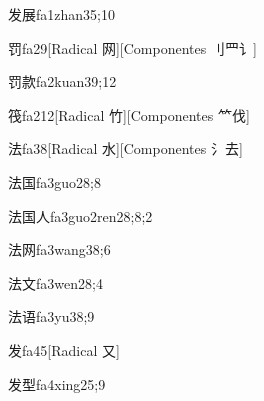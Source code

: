 \begin{verbete}{发展}{fa1zhan3}{5;10}
\end{verbete}

\begin{verbete}{罚}{fa2}{9}[Radical 网][Componentes ⺉⺫⻈]
\end{verbete}

\begin{verbete}{罚款}{fa2kuan3}{9;12}
\end{verbete}

\begin{verbete}{筏}{fa2}{12}[Radical 竹][Componentes ⺮伐]
\end{verbete}

\begin{verbete}{法}{fa3}{8}[Radical 水][Componentes ⺡去]
\end{verbete}

\begin{verbete}{法国}{fa3guo2}{8;8}
\end{verbete}

\begin{verbete}{法国人}{fa3guo2ren2}{8;8;2}
\end{verbete}

\begin{verbete}{法网}{fa3wang3}{8;6}
\end{verbete}

\begin{verbete}{法文}{fa3wen2}{8;4}
\end{verbete}

\begin{verbete}{法语}{fa3yu3}{8;9}
\end{verbete}

\begin{verbete}{发}{fa4}{5}[Radical ⼜]
\end{verbete}

\begin{verbete}{发型}{fa4xing2}{5;9}
\end{verbete}

